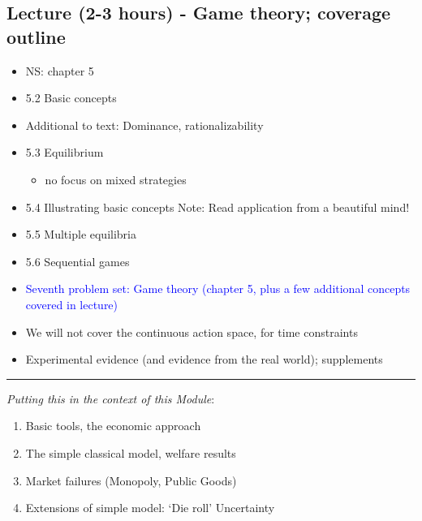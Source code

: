 \documentclass[]{article}
\providecommand{\tightlist}{%
  \setlength{\itemsep}{0pt}\setlength{\parskip}{0pt}}
\begin{document}
\hypertarget{lecture-2-3-hours---game-theory-coverage-outline}{%
\subsection{Lecture (2-3 hours) - Game theory; coverage outline}\label{lecture-2-3-hours---game-theory-coverage-outline}}

\begin{itemize}
\item
  NS: chapter 5
\item
  5.2 Basic concepts
\item
  Additional to text: Dominance, rationalizability
\item
  5.3 Equilibrium

  \begin{itemize}
  \tightlist
  \item
    no focus on mixed strategies
  \end{itemize}
\item
  5.4 Illustrating basic concepts
  Note: Read application from a beautiful mind!
\item
  5.5 Multiple equilibria
\item
  5.6 Sequential games
\item
  \textcolor{blue}{Seventh problem set: Game theory (chapter 5, plus a few additional concepts covered in lecture)}
\end{itemize}

\begin{itemize}
\tightlist
\item
  We will not cover the continuous action space, for time constraints
\end{itemize}

\begin{itemize}
\tightlist
\item
  Experimental evidence (and evidence from the real world); supplements
\end{itemize}

\begin{center}\rule{0.5\linewidth}{\linethickness}\end{center}

\bigskip

\emph{Putting this in the context of this Module}:

\begin{enumerate}
\def\labelenumi{\arabic{enumi}.}
\item
  Basic tools, the economic approach
\item
  The simple classical model, welfare results
\item
  Market failures (Monopoly, Public Goods)
\item
  Extensions of simple model: `Die roll' Uncertainty
\end{enumerate}
\end{document}
